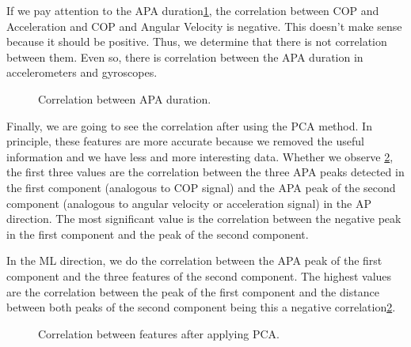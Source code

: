 If we pay attention to the APA duration\ref{fig:Corr_duration}, the correlation between COP and Acceleration and COP and Angular Velocity is negative. This doesn't make sense because it should be positive. Thus, we determine that there is not correlation between them. Even so, there is correlation between the APA duration in accelerometers and gyroscopes.
\begin{figure}[H]
	\centering
	\caption{Correlation between APA duration.}
	\label{fig:Corr_duration}
\end{figure}

Finally, we are going to see the correlation after using the PCA method. In principle, these features are more accurate because we removed the useful information and we have less and more interesting data.
Whether we observe \ref{fig:Corr_PCA}, the first three values are the correlation between the three APA peaks detected in the first component (analogous to COP signal) and the APA peak of the second component (analogous to angular velocity or acceleration signal) in the AP direction. The most significant value is the correlation between the negative peak in the first component and the peak of the second component.

In the ML direction, we do the correlation between the APA peak of the first component and the three features of the second component. The highest values are the correlation between the peak of the first component and the distance between both peaks of the second component being this a negative correlation\ref{fig:Corr_PCA}.

\begin{figure}[H]
	\centering
	\caption{Correlation between features after applying PCA.}
	\label{fig:Corr_PCA}
\end{figure}
